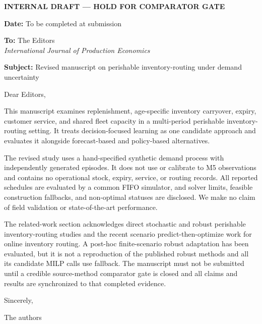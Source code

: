 \documentclass[11pt,a4paper]{article}
\begin{document}
\begin{center}
{\Large\bfseries INTERNAL DRAFT — HOLD FOR COMPARATOR GATE}
\end{center}

\noindent\textbf{Date:} To be completed at submission

\vspace{1em}
\noindent\textbf{To:} The Editors \\
\textit{International Journal of Production Economics}

\vspace{1em}
\noindent\textbf{Subject:} Revised manuscript on perishable inventory-routing under demand uncertainty

\vspace{1em}
Dear Editors,

This manuscript examines replenishment, age-specific inventory carryover, expiry, customer service, and shared fleet capacity in a multi-period perishable inventory-routing setting. It treats decision-focused learning as one candidate approach and evaluates it alongside forecast-based and policy-based alternatives.

The revised study uses a hand-specified synthetic demand process with independently generated episodes. It does not use or calibrate to M5 observations and contains no operational stock, expiry, service, or routing records. All reported schedules are evaluated by a common FIFO simulator, and solver limits, feasible construction fallbacks, and non-optimal statuses are disclosed. We make no claim of field validation or state-of-the-art performance.

The related-work section acknowledges direct stochastic and robust perishable inventory-routing studies and the recent scenario predict-then-optimize work for online inventory routing. A post-hoc finite-scenario robust adaptation has been evaluated, but it is not a reproduction of the published robust methods and all its candidate MILP calls use fallback. The manuscript must not be submitted until a credible source-method comparator gate is closed and all claims and results are synchronized to that completed evidence.

\vspace{1em}
Sincerely,

\vspace{2em}
The authors
\end{document}
